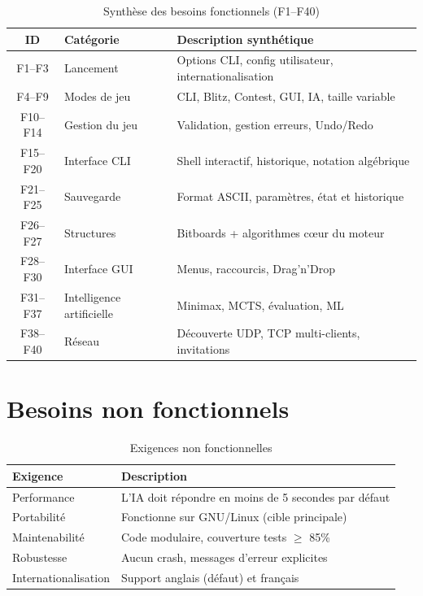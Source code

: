 \documentclass[a4paper]{article}
\begin{document}
\begin{table}[H]
\centering
\small
\begin{tabular}{clp{8.5cm}}
\toprule
\textbf{ID} & \textbf{Catégorie} & \textbf{Description synthétique} \\
\midrule

F1--F3 & Lancement & Options CLI, config utilisateur, internationalisation \\

F4--F9 & Modes de jeu & CLI, Blitz, Contest, GUI, IA, taille variable \\

F10--F14 & Gestion du jeu & Validation, gestion erreurs, Undo/Redo \\

F15--F20 & Interface CLI & Shell interactif, historique, notation algébrique \\

F21--F25 & Sauvegarde & Format ASCII, paramètres, état et historique \\

F26--F27 & Structures & Bitboards + algorithmes cœur du moteur \\

F28--F30 & Interface GUI & Menus, raccourcis, Drag'n'Drop \\

F31--F37 & Intelligence artificielle & Minimax, MCTS, évaluation, ML \\

F38--F40 & Réseau & Découverte UDP, TCP multi-clients, invitations \\

\bottomrule
\end{tabular}
\caption{Synthèse des besoins fonctionnels (F1--F40)}
\end{table}



\section{Besoins non fonctionnels}


\begin{table}[H]
\centering
\begin{tabular}{lp{10cm}}
\toprule
\textbf{Exigence} & \textbf{Description} \\
\midrule
Performance & L'IA doit répondre en moins de 5 secondes par défaut \\
Portabilité & Fonctionne sur GNU/Linux (cible principale) \\
Maintenabilité & Code modulaire, couverture tests $\geq$ 85\% \\
Robustesse & Aucun crash, messages d'erreur explicites \\
Internationalisation & Support anglais (défaut) et français \\
\bottomrule
\end{tabular}
\caption{Exigences non fonctionnelles}
\end{table}
\end{document}
